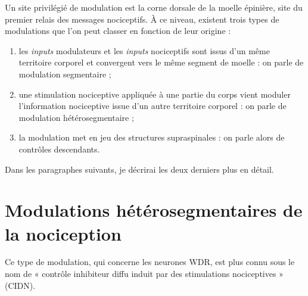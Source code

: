 \documentclass[a4paper,12pt,twoside]{report}
\begin{document}
Un site privilégié de modulation est la corne dorsale de la moelle épinière, site du premier relais des messages nociceptifs. À ce niveau, existent trois types de modulations que l’on peut classer en fonction de leur origine : 

\begin{enumerate}
\item les \textit{inputs} modulateurs et les \textit{inputs} nociceptifs sont issus d’un même territoire corporel et convergent vers le même segment de moelle : on parle de modulation segmentaire ; 
\item une stimulation nociceptive appliquée à une partie du corps vient moduler l’information nociceptive issue d’un autre territoire corporel : on parle de modulation hétérosegmentaire ; 
\item la modulation met en jeu des structures supraspinales : on parle alors de contrôles descendants.
\end{enumerate}

Dans les paragraphes suivants, je décrirai les deux derniers plus en détail.

\section{Modulations hétérosegmentaires de la nociception}
\label{Modulations hétérosegmentaires} 

Ce type de modulation, qui concerne les neurones WDR, est plus connu sous le nom de « contrôle inhibiteur diffu induit par des stimulations nociceptives » (CIDN).
\end{document}
